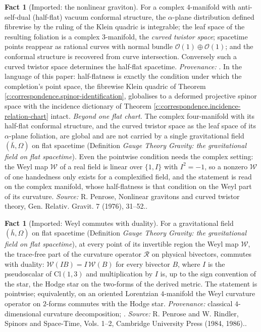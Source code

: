 \documentclass[11pt]{article}
\theoremstyle{definition}
\newtheorem{fact}[theorem]{Fact}
\theoremstyle{plain}
\newcommand{\changedmark}[2]{\marginpar{\raggedright\scriptsize\color{#1}#2}}
\providecommand{\Cl}{}\renewcommand{\Cl}{\mathrm{Cl}}
\providecommand{\hb}{}\renewcommand{\hb}{\bar{h}}
\begin{document}
\begin{fact}[Imported: the nonlinear graviton]\label{c:correspondence.imported-nonlinear-graviton}
\changedmark{BurntOrange}{changed since the deposit}
For a complex $4$-manifold with anti-self-dual (half-flat) vacuum conformal structure, the $\alpha$-plane distribution defined fibrewise by the ruling of the Klein quadric is integrable; the leaf space of the resulting foliation is a complex $3$-manifold, the \emph{curved twistor space}; spacetime points reappear as rational curves with normal bundle $\mathcal{O}(1)\oplus\mathcal{O}(1)$; and the conformal structure is recovered from curve intersection. Conversely such a curved twistor space determines the half-flat spacetime. \emph{Provenance:} \cite{Penrose76}. In the language of this paper: half-flatness is exactly the condition under which the completion's point space, the fibrewise Klein quadric of Theorem \ref{c:correspondence.spinor-identification}, globalises to a deformed projective spinor space with the incidence dictionary of Theorem \ref{c:correspondence.incidence-relation-chart} intact. \emph{Beyond one flat chart.} The complex four-manifold with its half-flat conformal structure, and the curved twistor space as the leaf space of its $\alpha$-plane foliation, are global and are not carried by a single gravitational field $(\hb, \Omega)$ on flat spacetime (Definition \emph{Gauge Theory Gravity: the gravitational field on flat spacetime}). Even the pointwise condition needs the complex setting: the Weyl map $\mathcal{W}$ of a real field is linear over $\{1, I\}$ with $I^{2} = -1$, so a nonzero $\mathcal{W}$ of one handedness only exists for a complexified field, and the statement is read on the complex manifold, whose half-flatness is that condition on the Weyl part of its curvature.
\emph{Source:} R. Penrose, Nonlinear gravitons and curved twistor theory, Gen. Relativ. Gravit. 7 (1976), 31--52..
\end{fact}

\begin{fact}[Imported: Weyl commutes with duality]\label{c:correspondence.imported-weyl-commutes-duality}
\changedmark{gray}{reworded}
For a gravitational field $(\hb, \Omega)$ on flat spacetime (Definition \emph{Gauge Theory Gravity: the gravitational field on flat spacetime}), at every point of its invertible region the Weyl map $\mathcal{W}$, the trace-free part of the curvature operator $\mathcal{R}$ on physical bivectors, commutes with duality: $\mathcal{W}(IB) = I\,\mathcal{W}(B)$ for every bivector $B$, where $I$ is the pseudoscalar of $\Cl(1,3)$ and multiplication by $I$ is, up to the sign convention of the star, the Hodge star on the two-forms of the derived metric. The statement is pointwise; equivalently, on an oriented Lorentzian $4$-manifold the Weyl curvature operator on $2$-forms commutes with the Hodge star. \emph{Provenance:} classical $4$-dimensional curvature decomposition; \cite{PenroseRindler86}.
\emph{Source:} R. Penrose and W. Rindler, Spinors and Space-Time, Vols. 1--2, Cambridge University Press (1984, 1986)..
\end{fact}
\end{document}
